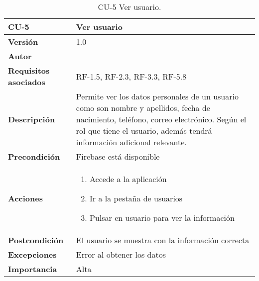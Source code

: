 \begin{table}[p]
	\centering
	\begin{tabularx}{\linewidth}{ p{} p{} }
		\toprule
		\textbf{CU-5}    & \textbf{Ver usuario}\\
		\toprule
		\textbf{Versión}              & 1.0    \\
		\textbf{Autor}                & {\nombre} \\
		\textbf{Requisitos asociados} & RF-1.5, RF-2.3, RF-3.3, RF-5.8 \\
		\textbf{Descripción}          & Permite ver los datos personales de un usuario como son nombre y apellidos, fecha de nacimiento, teléfono, correo electrónico. Según el rol que tiene el usuario, además tendrá información adicional relevante.\\
		\textbf{Precondición}         & Firebase está disponible \\
		\textbf{Acciones}             &
		\begin{enumerate}
			\def\labelenumi{\arabic{enumi}.}
			\tightlist
			\item Accede a la aplicación
			\item Ir a la pestaña de usuarios
			\item Pulsar en usuario para ver la información
		\end{enumerate}\\
		\textbf{Postcondición}        & El usuario se muestra con la información correcta \\
		\textbf{Excepciones}          & Error al obtener los datos\\
		\textbf{Importancia}          & Alta \\
		\bottomrule
	\end{tabularx}
	\caption{CU-5 Ver usuario.}
\end{table}

